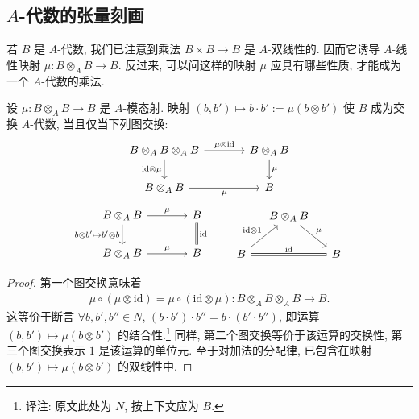 \subsection{$A$-代数的张量刻画}\label{sec:galois-1-8-10}
若 $B$ 是 $A$-代数, 我们已注意到乘法 $B\times B\longrightarrow B$ 是 $A$-双线性的. 因而它诱导 $A$-线性映射 $\mu:B\otimes_A B\longrightarrow B$. 反过来, 可以问这样的映射 $\mu$ 应具有哪些性质, 才能成为一个 $A$-代数的乘法.
\begin{proposition*}
设 $\mu:B\otimes_A B\longrightarrow B$ 是 $A$-模态射. 映射 $(b,b')\mapsto b\cdot b':=\mu(b\otimes b')$ 使 $B$ 成为交换 $A$-代数, 当且仅当下列图交换:
\[
\begin{tikzcd}[column sep=large]
B\otimes_A B\otimes_A B\arrow[r,"\mu\otimes\mathrm{id}"]\arrow[d,"\mathrm{id}\otimes\mu"']&B\otimes_A B\arrow[d,"\mu"]\\
B\otimes_A B\arrow[r,"\mu"']&B
\end{tikzcd}
\]
\[
\begin{tikzcd}[column sep=large]
B\otimes_A B\arrow[r,"\mu"]\arrow[d,"{b\otimes b'\mapsto b'\otimes b}"']&B\arrow[d,equal,"\mathrm{id}"]\\
B\otimes_A B\arrow[r,"\mu"]&B
\end{tikzcd}
\qquad
\begin{tikzcd}[column sep=small]
&B\otimes_A B\arrow[dr,"\mu"]&\\
B\arrow[ur,"\mathrm{id}\otimes1"]\arrow[rr,equal,"\mathrm{id}"]&&B
\end{tikzcd}
\]
\end{proposition*}
\begin{proof}
第一个图交换意味着
\begin{align*}
\mu\circ(\mu\otimes\mathrm{id})=\mu\circ(\mathrm{id}\otimes\mu):B\otimes_A B\otimes_A B\longrightarrow B.
\end{align*}
这等价于断言 $\forall b,b',b''\in N$, $(b\cdot b')\cdot b''=b\cdot(b'\cdot b'')$, 即运算 $(b,b')\mapsto\mu(b\otimes b')$ 的结合性.\footnote{译注: 原文此处为 $N$, 按上下文应为 $B$.} 同样, 第二个图交换等价于该运算的交换性, 第三个图交换表示 $1$ 是该运算的单位元. 至于对加法的分配律, 已包含在映射 $(b,b')\mapsto\mu(b\otimes b')$ 的双线性中.
\end{proof}

